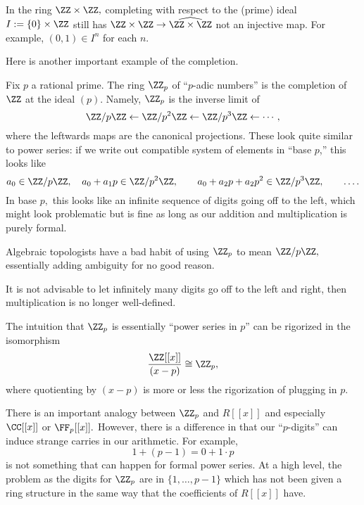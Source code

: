 \begin{nex}[Miles]
	In the ring $\ZZ\times\ZZ,$ completing with respect to the (prime) ideal $I:=\{0\}\times\ZZ$ still has $\ZZ\times\ZZ\to\widehat{\ZZ\times\ZZ}$ not an injective map. For example, $(0,1)\in I^n$ for each $n.$
\end{nex}
Here is another important example of the completion.
\begin{example}
	Fix $p$ a rational prime. The ring $\ZZ_p$ of ``$p$-adic numbers'' is the completion of $\ZZ$ at the ideal $(p).$ Namely, $\ZZ_p$ is the inverse limit of
	\[\ZZ/p\ZZ\leftarrow\ZZ/p^2\ZZ\leftarrow\ZZ/p^3\ZZ\leftarrow\cdots,\]
	where the leftwards maps are the canonical projections. These look quite similar to power series: if we write out compatible system of elements in ``base $p$,'' this looks like
	\[a_0\in\ZZ/p\ZZ,\quad a_0+a_1p\in\ZZ/p^2\ZZ,\qquad a_0+a_2p+a_2p^2\in\ZZ/p^3\ZZ,\qquad\ldots.\]
	In base $p,$ this looks like an infinite sequence of digits going off to the left, which might look problematic but is fine as long as our addition and multiplication is purely formal.
\end{example}
\begin{remark}
	Algebraic topologists have a bad habit of using $\ZZ_p$ to mean $\ZZ/p\ZZ,$ essentially adding ambiguity for no good reason.
\end{remark}
\begin{remark}
	It is not advisable to let infinitely many digits go off to the left and right, then multiplication is no longer well-defined.
\end{remark}
\begin{remark}[Nir]
	The intuition that $\ZZ_p$ is essentially ``power series in $p$'' can be rigorized in the isomorphism
	\[\frac{\ZZ[[x]]}{(x-p)}\cong\ZZ_p,\]
	where quotienting by $(x-p)$ is more or less the rigorization of plugging in $p.$
\end{remark}
There is an important analogy between $\ZZ_p$ and $R[[x]]$ and especially $\CC[[x]]$ or $\FF_p[[x]].$ However, there is a difference in that our ``$p$-digits'' can induce strange carries in our arithmetic. For example,
\[1+(p-1)=0+1\cdot p\]
is not something that can happen for formal power series. At a high level, the problem as the digits for $\ZZ_p$ are in $\{1,\ldots,p-1\}$ which has not been given a ring structure in the same way that the coefficients of $R[[x]]$ have.

